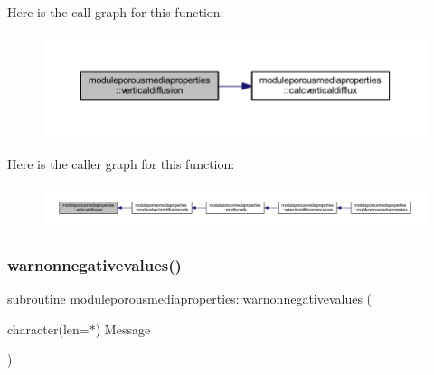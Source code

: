 Here is the call graph for this function\+:\nopagebreak
\begin{figure}[H]
\begin{center}
\leavevmode
\includegraphics[width=350pt]{namespacemoduleporousmediaproperties_a872ba647c81cc1f00e69bd02b7418258_cgraph}
\end{center}
\end{figure}
Here is the caller graph for this function\+:\nopagebreak
\begin{figure}[H]
\begin{center}
\leavevmode
\includegraphics[width=350pt]{namespacemoduleporousmediaproperties_a872ba647c81cc1f00e69bd02b7418258_icgraph}
\end{center}
\end{figure}
\mbox{\label{namespacemoduleporousmediaproperties_a457fa586000763f38ce30bbaf81de100}} 
\subsubsection{\texorpdfstring{warnonnegativevalues()}{warnonnegativevalues()}}
{\footnotesize\ttfamily subroutine moduleporousmediaproperties\+::warnonnegativevalues (\begin{DoxyParamCaption}\item[{character(len=$\ast$)}]{Message }\end{DoxyParamCaption})\hspace{0.3cm}{\ttfamily [private]}}

